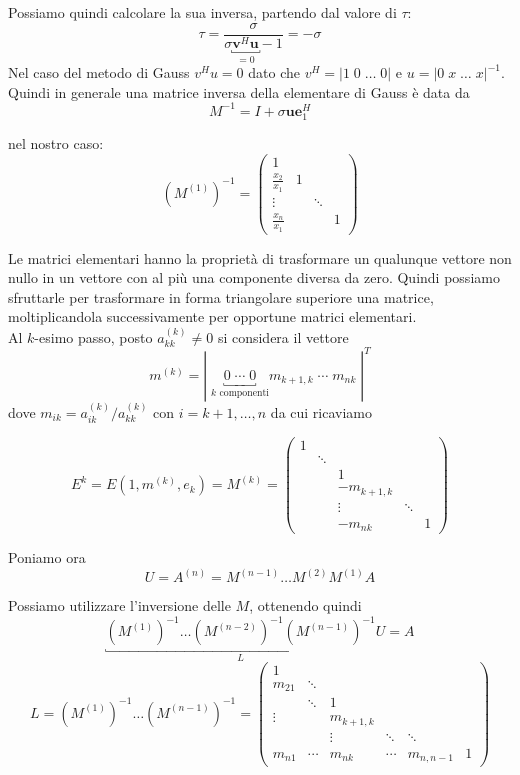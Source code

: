 Possiamo quindi calcolare la  sua inversa, partendo dal valore di $\tau$:
$$ \tau = \frac{\sigma}{\sigma \underbracket{\mathbf{v}^{H}\mathbf{u}}_{=0}-1}= -\sigma$$
Nel caso del metodo di Gauss $v^{H}u = 0$ dato che $v^{H}=|1 \; 0 \; \ldots
\; 0|$ e $u = |0 \; x \; \ldots \; x|^{-1}$.\\
Quindi in generale una matrice inversa della elementare di Gauss \`e data da
$$ M^{-1} = I + \sigma \mathbf{u} \mathbf{e}_1^{H} $$

nel nostro caso:
\[(M^{(1)})^{-1} = 
\begin{pmatrix}
1               &   &        &                   \\
\frac{x_2}{x_1} & 1 &        &                   \\
\vdots          &   & \ddots &                   \\
\frac{x_n}{x_1} &   &        & 1 
\end{pmatrix}\]

Le matrici elementari hanno la propriet\`a di trasformare un
qualunque vettore non nullo in un vettore con al più una componente
diversa da zero. Quindi possiamo sfruttarle per trasformare in forma
triangolare superiore una matrice, moltiplicandola successivamente per
opportune matrici elementari.\\
Al $k$-esimo passo, posto $a^{(k)}_{kk} \neq 0$ si considera il vettore 
$$ m^{(k)} = | \; \underbracket{0 \; \cdots \; 0}_{k\text{ componenti}} m_{k+1,k} \; \cdots \; m_{nk} \; |^T $$
dove $m_{ik} = a^{(k)}_{ik} / a^{(k)}_{kk}$ con $i = k+1,\ldots,n$ da
cui ricaviamo 

\[ E^{k} = E(1,m^{(k)}, e_k) = M^{(k)} =
\begin{pmatrix}
1 &        &            &        & \\
  & \ddots &            &        & \\
  &        & 1          &        & \\
  &        & -m_{k+1,k} &        & \\
  &        & \vdots     & \ddots & \\
  &        & -m_{nk}    &        & 1 
\end{pmatrix}\]

Poniamo ora 
$$ U = A^{(n)} = M^{(n-1)} \ldots M^{(2)} M^{(1)} A $$

Possiamo utilizzare l'inversione delle $M$, ottenendo quindi
$$ \underbracket{(M^{(1)})^{-1} \ldots (M^{(n-2)})^{-1} (M^{(n-1)})^{-1}}_{L} U = A $$
\[ L = (M^{(1)})^{-1} \ldots (M^{(n-1)})^{-1} = 
\begin{pmatrix}
1      &        &           &        &           & \\
m_{21} & \ddots &           &        &           & \\
       & \ddots & 1         &        &           & \\
\vdots &        & m_{k+1,k} &        &           & \\
       &        & \vdots    & \ddots & \ddots    & \\
m_{n1} & \cdots & m_{nk}    & \cdots & m_{n,n-1} & 1
\end{pmatrix}\]



